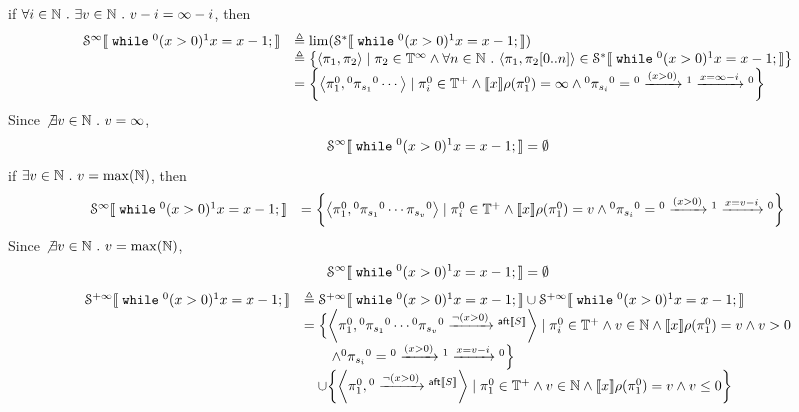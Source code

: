 \begin{example}
\[ \]
  if $\forall i \in \mathbb{N} ~.~ \exists v \in \mathbb{N} ~.~ 
  v - i = \infty - i$, then
 \[
 \begin{array}{ll}
  \mathcal{S}^{\infty}\sem{\ewhile {}^0 (x > 0) {}^1 x = x - 1;} 
  & \triangleq \lim(\mathcal{S}^*\sem{\ewhile {}^0 (x > 0) {}^1 x = x - 1;}) 
  \\
  & \triangleq \left\{ \config{\pi_1, \pi_2} \mid 
  \pi_2 \in \mathbb{T}^{\infty} \land \forall n \in \mathbb{N} \st \config{\pi_1, \pi_2[0..n]}\in \mathcal{S}^{*}\sem{\ewhile {}^0 (x > 0) {}^1 x = x - 1;}
  \right\}
  \\
  & = \left\{ \left< \pi_1^0, {}^0 \pi_{s_1} {}^0 \cdots \right>
 \mid \pi_i^0 \in \mathbb{T^{+}} \land
 \sem{x}\env(\pi_1^0) = \infty
 \land
 {}^0 \pi_{s_i} {}^0 = {}^0 \xrightarrow{(x > 0)} {}^1 \xrightarrow{x = \infty - i} {}^0
 \right\}
 \end{array}
 \]
  Since $\not\exists v \in \mathbb{N} ~.~ v = \infty$, 
 \[
   \mathcal{S}^{\infty}
   \llbracket \;\mathtt{while}\; {}^0 (x > 0) {}^1 x = x - 1; \rrbracket
   = \emptyset
 \]
 if $\exists v \in \mathbb{N} ~.~ v = \max(\mathbb{N})$, then
  \[
 \begin{array}{ll}
  \mathcal{S}^{\infty}\sem{\ewhile {}^0 (x > 0) {}^1 x = x - 1;}
  &  = \left\{ \left< \pi_1^0, {}^0 \pi_{s_1} {}^0 \cdots \pi_{s_{v}} {}^0 \right>
 \mid \pi_i^0 \in \mathbb{T^{+}} \land
 \sem{x}\env(\pi_1^0) = v
 \land
 {}^0 \pi_{s_i} {}^0 = {}^0 \xrightarrow{(x > 0)} {}^1 \xrightarrow{x = v - i} {}^0
 \right\}
 \end{array}
 \]
 Since $\not\exists v \in \mathbb{N} ~.~ v = \max(\mathbb{N})$, 
 \[
   \mathcal{S}^{\infty}\llbracket \;\mathtt{while}\; {}^0 (x > 0) {}^1 x = x - 1; \rrbracket
   = \emptyset
 \]
  \[
 \begin{array}{ll}
  \mathcal{S}^{+\infty}\sem{\ewhile {}^0 (x > 0) {}^1 x = x - 1;} 
 &  \triangleq \mathcal{S}^{+\infty}\sem{\ewhile {}^0 (x > 0) {}^1 x = x - 1;} 
  \cup
  \mathcal{S}^{+\infty}\sem{\ewhile {}^0 (x > 0) {}^1 x = x - 1;}
  \\
   & = \Big\{ \left< \pi_1^0, {}^0 \pi_{s_1} {}^0 \cdots {}^0 \pi_{s_v} {}^0 \xrightarrow{\neg(x > 0)} {}^{\mathsf{aft}\sem{S}}\right>
 \mid \pi_i^0 \in \mathbb{T^{+}} \land v \in \mathbb{N} \land
 \sem{x}\env(\pi_1^0) = v
 \land v > 0  \\
 & \qquad \land
 {}^0 \pi_{s_i} {}^0 = {}^0 \xrightarrow{(x > 0)} {}^1 \xrightarrow{x = v - i} {}^0
 \Big\}
   \\ & \quad \cup 
 \left\{ \left< \pi_1^0, {}^0 \xrightarrow{\neg(x > 0)} {}^{\mathsf{aft}\sem{S}} \right> 
 \mid \pi_1^0 \in \mathbb{T^{+}} \land v \in \mathbb{N} \land
  \sem{x}\env(\pi_1^0) = v
 \land v \leq 0 \right\}
 \end{array}
 \]
 \end{example}
